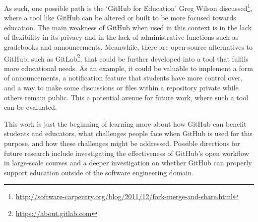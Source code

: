 As such, one possible path is the `GitHub for Education' Greg Wilson discussed\footnote{\url{http://software-carpentry.org/blog/2011/12/fork-merge-and-share.html}}, where a tool like GitHub can be altered or built to be more focused towards education. The main weakness of GitHub when used in this context is in the lack of flexibility in its privacy and in the lack of administrative functions such as gradebooks and announcements. Meanwhile, there are open-source alternatives to GitHub, such as GitLab\footnote{\url{https://about.gitlab.com}}, that could be further developed into a tool that fulfils more educational needs. As an example, it could be valuable to implement a form of announcements, a notification feature that students have more control over, and a way to make some discussions or files within a repository private while others remain public. This a potential avenue for future work, where such a tool can be evaluated.

This work is just the beginning of learning more about how GitHub can benefit students and educators, what challenges people face when GitHub is used for this purpose, and how these challenges might be addressed. Possible directions for future research include investigating the effectiveness of GitHub's open workflow in large-scale courses and a deeper investigation on whether GitHub can properly support education outside of the software engineering domain.

